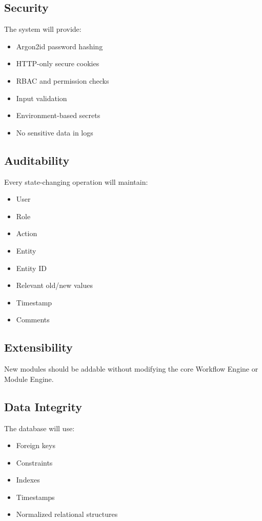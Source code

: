 \documentclass[12pt,a4paper]{article}
\begin{document}
\subsection{Security}

The system will provide:

\begin{itemize}
    \item Argon2id password hashing
    \item HTTP-only secure cookies
    \item RBAC and permission checks
    \item Input validation
    \item Environment-based secrets
    \item No sensitive data in logs
\end{itemize}

\subsection{Auditability}

Every state-changing operation will maintain:

\begin{itemize}
    \item User
    \item Role
    \item Action
    \item Entity
    \item Entity ID
    \item Relevant old/new values
    \item Timestamp
    \item Comments
\end{itemize}

\subsection{Extensibility}

New modules should be addable without modifying the core Workflow
Engine or Module Engine.

\subsection{Data Integrity}

The database will use:

\begin{itemize}
    \item Foreign keys
    \item Constraints
    \item Indexes
    \item Timestamps
    \item Normalized relational structures
\end{itemize}
\end{document}
